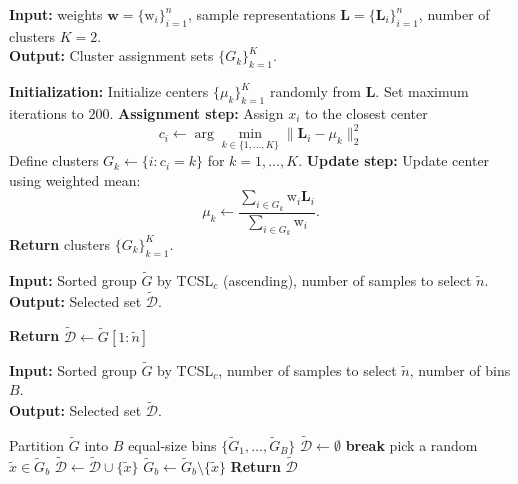 \documentclass[letter,11pt]{article}
\begin{document}
\begin{algorithm}[t]
\caption{$\textproc{wKMEANS}$}
\label{alg:wkmeans}
\textbf{Input:}  weights $\mathbf{w}=\{\mathrm{w}_i\}_{i=1}^n$, sample representations $\mathbf{L}=\{\mathbf{L}_i\}_{i=1}^n$, number of clusters $K\!=\!2$. \\
\textbf{Output:} Cluster assignment sets $\{G_k\}_{k=1}^K$.
\begin{algorithmic}[1]
\State \textbf{Initialization:} Initialize centers $\{\mu_k\}_{k=1}^K$ randomly from $\mathbf{L}$. Set maximum iterations to $200$.
    \State \textbf{Assignment step:}
        \State Assign $x_i$ to the closest center
        \[
            c_i \leftarrow \arg\min_{k \in \{1,\dots,K\}} \|\mathbf{L}_i - \mu_k\|_2^2
        \]
    \EndFor
    \State Define clusters $G_k \leftarrow \{i\!:\!c_i\!=\!k\!\}$ for $k=1,\dots,K$.
    \State \textbf{Update step:}
        \State Update center using weighted mean:
        \[
            \mu_k \leftarrow 
            \frac{\sum_{i \in G_k} \mathrm{w}_i \mathbf{L}_i}{\sum_{i \in G_k} \mathrm{w}_i}.
        \]
    \EndFor
\EndWhile
\State \textbf{Return} clusters $\{G_k\}_{k=1}^K$.
\end{algorithmic}
\end{algorithm}



\begin{algorithm}[t]
\caption{$\textproc{SelectBot}$}
\label{alg:select-bottom}
\textbf{Input:} Sorted group $\tilde{G}$ by TCSL$_c$ (ascending), number of samples to select $\tilde{n}$.\\
\textbf{Output:} Selected set $\tilde{\mathcal{D}}$.
\begin{algorithmic}[1]
\State \textbf{Return} $\tilde{\mathcal{D}} \gets \tilde{G}[1\!:\!\tilde{n}]$
\end{algorithmic}
\end{algorithm}



\begin{algorithm}[t]
\caption{$\textproc{SelectHist}$}
\label{alg:select-hist}
\textbf{Input:} Sorted group $\tilde{G}$ by TCSL$_c$, number of samples to select $\tilde{n}$, number of bins $B$.\\
\textbf{Output:} Selected set $\tilde{\mathcal{D}}$.
\begin{algorithmic}[1]
\State Partition $\tilde{G}$ into $B$ equal-size bins $\{\tilde{G}_1,\ldots,\tilde{G}_B\}$
\State $\tilde{\mathcal{D}} \gets \emptyset$
              \State \textbf{break} 
        \EndIf
            \State pick a random $\tilde{x} \in \tilde{G}_b$
            \State $\tilde{\mathcal{D}} \gets \tilde{\mathcal{D}} \cup \{\tilde{x}\}$
            \State $\tilde{G}_b \gets \tilde{G}_b \setminus \{\tilde{x}\}$
        \EndIf
    \EndFor
\EndWhile
\State \textbf{Return} $\tilde{\mathcal{D}}$
\end{algorithmic}
\end{algorithm}
\end{document}
